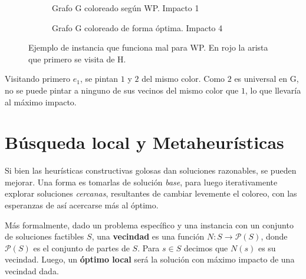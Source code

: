 \begin{figure}[H]
\begin{subfigure}[H]{0.45\textwidth}
        \caption{Grafo G coloreado según WP. Impacto 1}
    \end{subfigure}
    \begin{subfigure}[H]{0.45\textwidth}
        \centering
        \caption{Grafo G coloreado de forma óptima. Impacto 4}
    \end{subfigure}
    \caption{Ejemplo de instancia que funciona mal para WP. En rojo la arista que primero se visita de H. }
    \label{fig:wp_coloreo}
\end{figure}

Visitando primero $e_1$, se pintan $1$ y $2$ del mismo color. Como $2$ es universal en G, no se puede pintar a ninguno de sus vecinos del mismo color que $1$, lo que llevaría al máximo impacto.

\section{Búsqueda local y Metaheurísticas}

Si bien las heurísticas constructivas golosas dan soluciones razonables, se pueden mejorar. Una forma es tomarlas de solución \textit{base}, para luego iterativamente explorar soluciones \textit{cercanas}, resultantes de cambiar levemente el coloreo, con las esperanzas de así acercarse más al óptimo.

Más formalmente, dado un problema específico y una instancia con un conjunto de soluciones factibles $S$, una \textbf{vecindad} es una función $N: S \to \mathcal{P}(S)$, donde $\mathcal{P}(S)$ es el conjunto de partes de $S$. Para $s \in S$ decimos que $N(s)$ es su vecindad. Luego, un \textbf{óptimo local} será la solución con máximo impacto de una vecindad dada.

